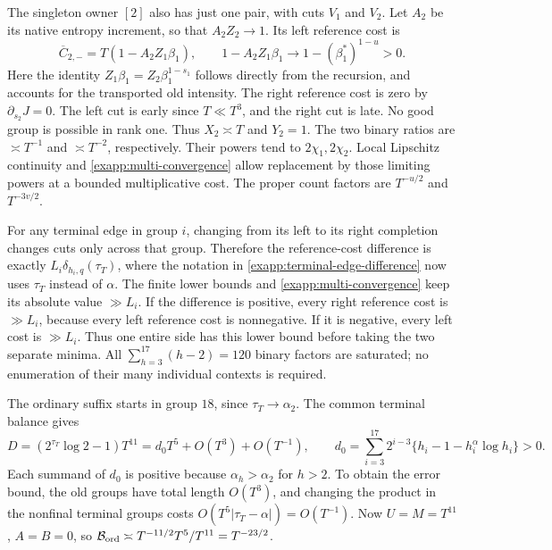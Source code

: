 The singleton owner \([2]\) also has just one pair, with cuts
\(V_1\) and \(V_2\).  Let \(A_2\) be its native entropy
increment, so that \(A_2Z_2\to1\).  Its left reference cost is
\begin{equation}
 \overline C_{2,-}=T(1-A_2Z_1\beta_1),\qquad
 1-A_2Z_1\beta_1\longrightarrow
          1-(\beta_1^*)^{1-u}>0.
 \label{exapp:old-singleton-score}
\end{equation}
Here the identity
\(Z_1\beta_1=Z_2\beta_1^{1-s_1}\) follows directly from the
recursion, and accounts for the transported old intensity.
The right reference cost is zero by \(\partial_{s_2}J=0\).
The left cut is early since \(T\ll T^3\), and the right cut is
late.  No good group is possible in rank one.  Thus
\(X_2\asymp T\) and \(Y_2=1\).
The two binary ratios are \(\asymp T^{-1}\) and
\(\asymp T^{-2}\), respectively.  Their powers tend to
\(2\chi_1,2\chi_2\).  Local Lipschitz continuity and
\eqref{exapp:multi-convergence} allow replacement by those limiting
powers at a bounded multiplicative cost.  The proper count factors
are \(T^{-u/2}\) and \(T^{-3v/2}\).

For any terminal edge in group \(i\), changing from its left to
its right completion changes cuts only across that group.  Therefore
the reference-cost difference is exactly
\(L_i\delta_{h_i,q}(\tau_T)\), where the notation in
\eqref{exapp:terminal-edge-difference} now uses \(\tau_T\) instead
of \(\alpha\).  The finite lower bounds and
\eqref{exapp:multi-convergence} keep its absolute value
\(\gg L_i\).  If the difference is positive, every right reference
cost is \(\gg L_i\), because every left reference cost is
nonnegative.  If it is negative, every left cost is \(\gg L_i\).
Thus one entire side has this lower bound before taking the two
separate minima.  All \(\sum_{h=3}^{17}(h-2)=120\) binary factors
are saturated; no enumeration of their many individual contexts
is required.

The ordinary suffix starts in group \(18\), since
\(\tau_T\to\alpha_2\).  The common terminal balance gives
\begin{equation}
 D=(2^{\tau_T}\log2-1)T^{11}
   =d_0T^5+O(T^3)+O(T^{-1}),\qquad
 d_0=\sum_{i=3}^{17}2^{i-3}
             \{h_i-1-h_i^\alpha\log h_i\}>0.
 \label{exapp:multi-ordinary}
\end{equation}
Each summand of \(d_0\) is positive because \(\alpha_h>\alpha_2\)
for \(h>2\).  To obtain the error bound, the old groups have total
length \(O(T^3)\), and changing the product in the nonfinal terminal
groups costs \(O(T^5|\tau_T-\alpha|)=O(T^{-1})\).
Now \(U=M=T^{11}\), \(A=B=0\), so
\(\mathcal B_{\rm ord}\asymp T^{-11/2}T^5/T^{11}=T^{-23/2}\).

